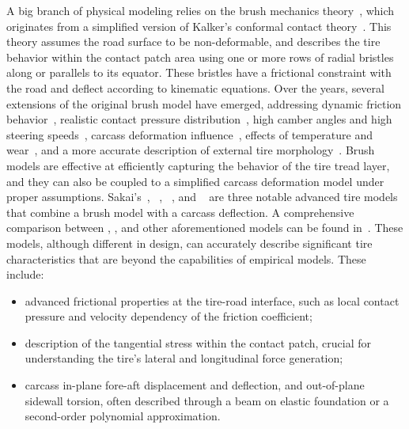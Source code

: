 A big branch of physical modeling relies on the brush mechanics theory~\cite{pacejka2012tire}, which originates from a simplified version of Kalker's conformal contact theory~\cite{kalker1967rolling, kalker1971transient, kalker1979survey, kalker1986railway, kalker1997simulation, meymand2016survey}. This theory assumes the road surface to be non-deformable, and describes the tire behavior within the contact patch area using one or more rows of radial bristles along or parallels to its equator. These bristles have a frictional constraint with the road and deflect according to kinematic equations. Over the years, several extensions of the original brush model have emerged, addressing dynamic friction behavior~\cite{deur2004brush, deur2005extensions, velenis2005dynamic, kikuuwe2019brushtype}, realistic contact pressure distribution~\cite{miyashita2010tire, fevrier2013method, xu2014analytical}, high camber angles and high steering speeds~\cite{higuchi1999transient, romano2022analytical}, carcass deformation influence~\cite{svendenius2006semiempirical, xu2014analytical, miyashita2010tire, miyashita2003analytical, miyashita2006new, kabe2006new, miyashita2015study, romano2019novel, romano2020unsteadystate, gil2020inplane}, effects of temperature and wear~\cite{fevrier2013method, harsh2019tire}, and a more accurate description of external tire morphology~\cite{chollet2012model, riehm2019brush}. Brush models are effective at efficiently capturing the behavior of the tire tread layer, and they can also be coupled to a simplified carcass deformation model under proper assumptions. Sakai's~\cite{sakai1981theoreticalI, sakai1981theoreticalII, sakai1981theoreticalIII, sakai1982theoreticalIV}, \NeoFiala{}~\cite{miyashita2003analytical, miyashita2006new, kabe2006new, miyashita2015study, miyashita2010tire}, \TreadSim{}~\cite{dehoogh2005implementing}, and \TaMeTire{}~\cite{fevrier2013method} are three notable advanced tire models that combine a brush model with a carcass deflection. A comprehensive comparison between \TreadSim{}, \TaMeTire{}, and other aforementioned models can be found in~\cite{sarkisov2019physical}. These models, although different in design, can accurately describe significant tire characteristics that are beyond the capabilities of empirical models. These include:
%
\begin{itemize}
  \setlength{\itemsep}{0pt}
  \item advanced frictional properties at the tire-road interface, such as local contact pressure and velocity dependency of the friction coefficient;
  \item description of the tangential stress within the contact patch, crucial for understanding the tire's lateral and longitudinal force generation;
  \item carcass in-plane fore-aft displacement and deflection, and out-of-plane sidewall torsion, often described through a beam on elastic foundation or a second-order polynomial approximation.
\end{itemize}

